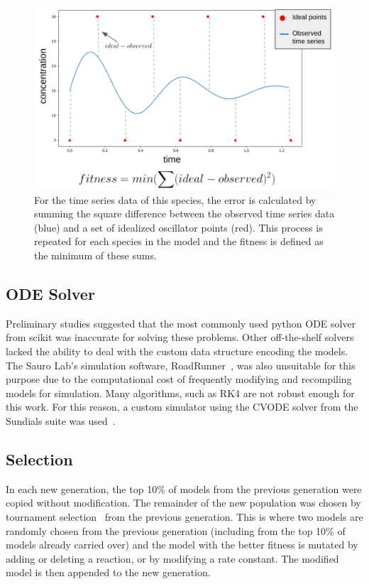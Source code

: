 \documentclass[12pt]{report}
\begin{document}
\begin{figure}
    \centering
    \includegraphics[width=15cm]{images/fitness.png}
    \caption[Oscillator objective function]{For the time series data of this species, the error is calculated by summing the square difference between the observed time series data (blue) and a set of idealized oscillator points (red). This process is repeated for each species in the model and the fitness is defined as the minimum of these sums. }
    \label{fig:fitness}
\end{figure}

\subsection{ODE Solver}
Preliminary studies suggested that the most commonly used python ODE solver from scikit was inaccurate for solving these problems. Other off-the-shelf solvers lacked the ability to deal with the custom data structure encoding the models. The Sauro Lab's simulation software, RoadRunner~\cite{Somogyi2015}, was also unsuitable for this purpose due to the computational cost of frequently modifying and recompiling models for simulation. Many algorithms, such as RK4 are not robust enough for this work. For this reason, a custom simulator using the CVODE solver from the Sundials suite was used~\cite{hindmarsh2005sundials}. 

\subsection{Selection}
In each new generation, the top 10\% of models from the previous generation were copied without modification. The remainder of the new population was chosen by tournament selection~\cite{Miller1995} from the previous generation. This is where two models are randomly chosen from the previous generation (including from the top 10\% of models already carried over) and the model with the better fitness is mutated by adding or deleting a reaction, or by modifying a rate constant. The modified model is then appended to the new generation. 
\end{document}
